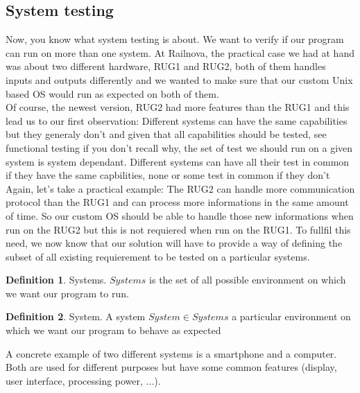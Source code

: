 \documentclass[12pt]{article}
\theoremstyle{definition}
\newtheorem{definition}{Definition}[section]
\theoremstyle{definition}
\theoremstyle{remark}
\begin{document}

\subsection{System testing}


Now, you know what system testing is about. We want to verify if our program can run on more than one system. At Railnova, the practical case we had at hand was about two different hardware, RUG1 and RUG2, both of them handles inputs and outputs differently and we wanted to make sure that our custom Unix based OS would run as expected on both of them.\\

Of course, the newest version, RUG2 had more features than the RUG1 and this lead us to our first observation: Different systems can have the same capabilities but they generaly don't and given that all capabilities should be tested, see functional testing if you don't recall why, the set of test we should run on a given system is system dependant. Different systems can have all their test in common if they have the same capbilities, none or some test in common if they don't\\

Again, let's take a practical example: The RUG2 can handle more communication protocol than the RUG1 and can process more informations in the same amount of time. So our custom OS should be able to handle those new informations when run on the RUG2 but this is not requiered when run on the RUG1. To fullfil this need, we now know that our solution will have to provide a way of defining the subset of all existing requierement to be tested on a particular systems.\\

\theoremstyle{definition}
\begin{definition}{Systems.} $Systems$ is the set of all possible environment on which we want our program to run.
\end{definition}

\theoremstyle{definition}
\begin{definition}{System.} A system $System \in Systems$ a particular environment on which we want our program to behave as expected
\end{definition}

A concrete example of two different systems is a smartphone and a computer. Both are used for different purposes but have some common features (display, user interface, processing power, ...).
\end{document}
